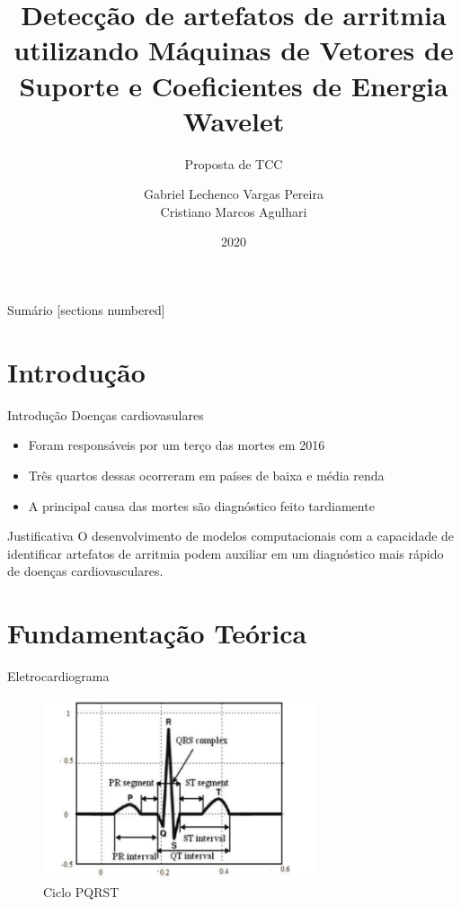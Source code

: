 \documentclass[10pt]{beamer}
\title{Detecção de artefatos de arritmia utilizando Máquinas de Vetores de Suporte e Coeficientes de Energia Wavelet}
\subtitle{Proposta de TCC}
\date{2020}
\author{Gabriel Lechenco Vargas Pereira \\
Cristiano Marcos Agulhari}
\institute{Universidade Tecnológica Federal do Paraná - UTFPR}
\begin{document}

\maketitle

\begin{frame}{Sumário}
  [sections numbered]
  \tableofcontents[hideallsubsections]
\end{frame}

\section{Introdução}

\begin{frame}{Introdução}
    Doenças cardiovasulares
    \begin{itemize}
        \item Foram responsáveis por um terço das mortes em 2016
        \item Três quartos dessas ocorreram em países de baixa e média renda
        \item A principal causa das mortes são diagnóstico feito tardiamente
    \end{itemize}
\end{frame}

\begin{frame} {Justificativa}
  O desenvolvimento de modelos computacionais com a capacidade de identificar 
  artefatos de arritmia podem auxiliar em um diagnóstico mais rápido de doenças 
  cardiovasculares.
\end{frame}

\section{Fundamentação Teórica}

\begin{frame}{Eletrocardiograma}
    \begin{figure}[]
      \centering
      \includegraphics[width=8cm]{images/pqrst.png}
      \caption{Ciclo PQRST \cite{faziludeen_ecg_2013}}
      \label{fig:pqrst}
    \end{figure}
\end{frame}
\end{document}
